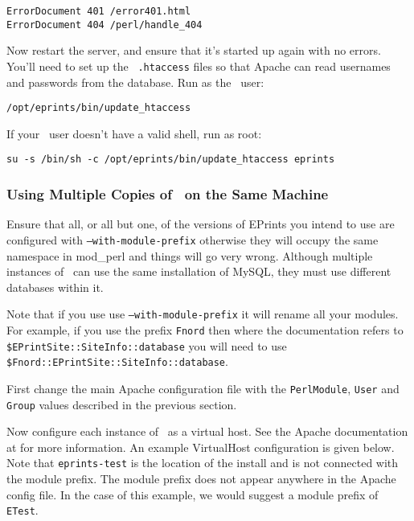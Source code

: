 \begin{verbatim}
ErrorDocument 401 /error401.html
ErrorDocument 404 /perl/handle_404
\end{verbatim}

Now restart the server, and ensure that it's started up again with no errors. You'll need to set up the \eprints\ {\tt .htaccess} files so that Apache can read usernames and passwords from the database. Run as the \eprints\ user:

\begin{verbatim}
/opt/eprints/bin/update_htaccess
\end{verbatim}

If your \eprints\ user doesn't have a valid shell, run as root:

\begin{verbatim}
su -s /bin/sh -c /opt/eprints/bin/update_htaccess eprints
\end{verbatim}

\subsubsection{Using Multiple Copies of \eprints\ on the Same Machine}
\label{manual_multiple}

Ensure that all, or all but one, of the versions of EPrints you intend to use are configured with {\tt --with-module-prefix} otherwise they will occupy the same namespace in mod\_perl and things will go very wrong. Although multiple instances of \eprints\ can use the same installation of MySQL, they must use different databases within it.

\par Note that if you use use {\tt --with-module-prefix} it will rename all your modules. For example, if you use the prefix {\tt Fnord} then where the documentation refers to {\tt \$EPrintSite::SiteInfo::database} you will need to use {\tt \$Fnord::EPrintSite::SiteInfo::database}.

\par First change the main Apache configuration file with the {\tt PerlModule}, {\tt User} and {\tt Group} values described in the previous section.

\par Now configure each instance of \eprints\ as a virtual host. See the Apache documentation at  for more information. An example VirtualHost configuration is given below. Note that {\tt eprints-test} is the location of the install and is not connected with the module prefix. The module prefix does not appear anywhere in the Apache config file. In the case of this example, we would suggest a module prefix of {\tt ETest}.
 
